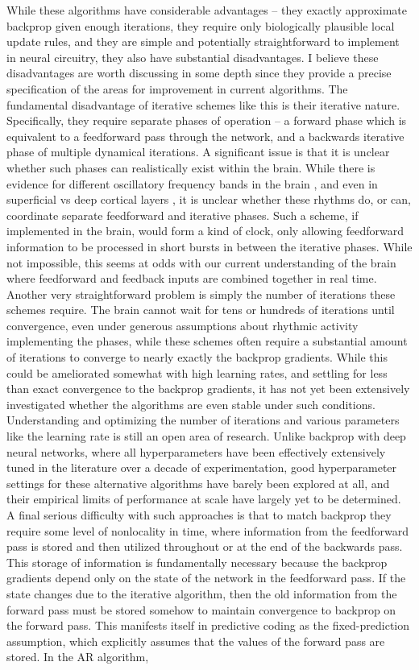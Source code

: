 While these algorithms have considerable advantages -- they exactly approximate backprop given enough iterations, they require only biologically plausible local update rules, and they are simple and potentially straightforward to implement in neural circuitry, they also have substantial disadvantages. I believe these disadvantages are worth discussing in some depth since they provide a precise specification of the areas for improvement in current algorithms. The fundamental disadvantage of iterative schemes like this is their iterative nature. Specifically, they require separate phases of operation -- a forward phase which is equivalent to a feedforward pass through the network, and a backwards iterative phase of multiple dynamical iterations. A significant issue is that it is unclear whether such phases can realistically exist within the brain. While there is evidence for different oscillatory frequency bands in the brain \citep{buzsaki2006rhythms}, and even in superficial vs deep cortical layers \citep{bastos2020layer,bastos2015visual}, it is unclear whether these rhythms do, or can, coordinate separate feedforward and iterative phases. Such a scheme, if implemented in the brain, would form a kind of clock, only allowing feedforward information to be processed in short bursts in between the iterative phases. While not impossible, this seems at odds with our current understanding of the brain where feedforward and feedback inputs are combined together in real time. Another very straightforward problem is simply the number of iterations these schemes require. The brain cannot wait for tens or hundreds of iterations until convergence, even under generous assumptions about rhythmic activity implementing the phases, while these schemes often require a substantial amount of iterations to converge to nearly exactly the backprop gradients. While this could be ameliorated somewhat with high learning rates, and settling for less than exact convergence to the backprop gradients, it has not yet been extensively investigated whether the algorithms are even stable under such conditions. Understanding and optimizing the number of iterations and various parameters like the learning rate is still an open area of research. Unlike backprop with deep neural networks, where all hyperparameters have been effectively extensively tuned in the literature over a decade of experimentation, good hyperparameter settings for these alternative algorithms have barely been explored at all, and their empirical limits of performance at scale have largely yet to be determined. A final serious difficulty with such approaches is that to match backprop they require some level of nonlocality in time, where information from the feedforward pass is stored and then utilized throughout or at the end of the backwards pass. This storage of information is fundamentally necessary because the backprop gradients depend only on the state of the network in the feedforward pass. If the state changes due to the iterative algorithm, then the old information from the forward pass must be stored somehow to maintain convergence to backprop on the forward pass. This manifests itself in predictive coding as the fixed-prediction assumption, which explicitly assumes that the values of the forward pass are stored. In the AR algorithm, 